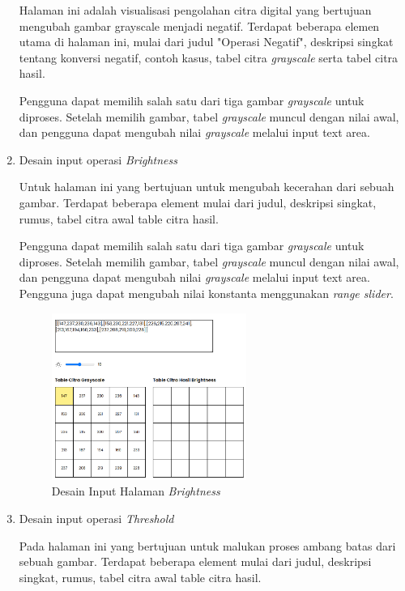\begin{enumerate}[leftmargin=1cm, itemindent=0.6cm,labelwidth=15pt, labelsep=5pt, listparindent=1cm,align=left]
        Halaman ini adalah visualisasi pengolahan citra digital yang bertujuan mengubah gambar grayscale menjadi negatif. Terdapat beberapa elemen utama di halaman ini, mulai dari judul "Operasi Negatif", deskripsi singkat tentang konversi negatif, contoh kasus, tabel citra \textit{grayscale} serta tabel citra hasil.

Pengguna dapat memilih salah satu dari tiga gambar \textit{grayscale} untuk diproses. Setelah memilih gambar, tabel \textit{grayscale} muncul dengan nilai awal, dan pengguna dapat mengubah nilai \textit{grayscale} melalui input text area.

    \item Desain input operasi \textit{Brightness}

Untuk halaman ini yang bertujuan untuk mengubah kecerahan dari sebuah gambar. Terdapat beberapa element mulai dari judul, deskripsi singkat, rumus, tabel citra awal table citra hasil.

Pengguna dapat memilih salah satu dari tiga gambar \textit{grayscale} untuk diproses. Setelah memilih gambar, tabel \textit{grayscale} muncul dengan nilai awal, dan pengguna dapat mengubah nilai \textit{grayscale} melalui input text area. Pengguna juga dapat mengubah nilai konstanta menggunakan \textit{range slider}.

          \begin{figure}[ht]
    	      \includegraphics[width=0.6\textwidth, center]{images/input-brightness.png}
              \caption{Desain Input Halaman \textit{Brightness}}
          \end{figure}

    \item Desain input operasi \textit{Threshold}

Pada halaman ini yang bertujuan untuk malukan proses ambang batas dari sebuah gambar. Terdapat beberapa element mulai dari judul, deskripsi singkat, rumus, tabel citra awal table citra hasil.


\end{enumerate}
